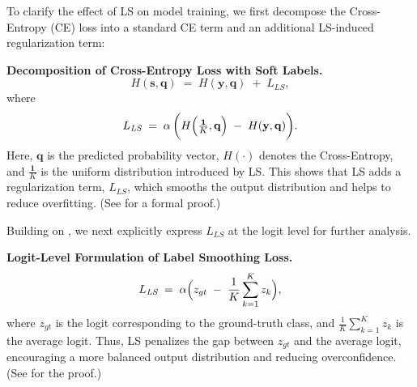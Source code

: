 To clarify the effect of LS on model training, we first decompose the Cross-Entropy (CE) loss into a standard CE term and an additional LS-induced regularization term:
\begin{lemma}
\label{lemma:ls-decomposition}
\textbf{Decomposition of Cross-Entropy Loss with Soft Labels.}
\begin{equation}
H(\mathbf{s}, \mathbf{q})
\;=\;
H(\mathbf{y}, \mathbf{q})
\;+\;
L_{\textit{LS}},
\end{equation}
where
\begin{equation}
L_{\textit{LS}}
\;=\;
\alpha\,\biggl(
    H\Bigl(\tfrac{\mathbf{1}}{K}, \mathbf{q}\Bigr)
    \;-\;
    H(\mathbf{y}, \mathbf{q})
\biggr).
\end{equation}
Here, \(\mathbf{q}\) is the predicted probability vector, \(H(\cdot)\) denotes the Cross-Entropy, and \(\frac{\mathbf{1}}{K}\) is the uniform distribution introduced by LS. This shows that LS adds a regularization term, \(L_{\textit{LS}}\), which smooths the output distribution and helps to reduce overfitting. (See  for a formal proof.)
\end{lemma}

\noindent
Building on , we next explicitly express \(L_{\textit{LS}}\) at the logit level for further analysis.

\begin{theorem}
\label{th:ce_ls}
\textbf{Logit-Level Formulation of Label Smoothing Loss.}
\begin{equation}
L_{\textit{LS}}
\;=\;
\alpha
\Bigl(
    z_{gt}
    \;-\;
    \frac{1}{K} \sum_{k=1}^K z_k
\Bigr),
\end{equation}
where \(z_{gt}\) is the logit corresponding to the ground-truth class, and \(\tfrac{1}{K} \sum_{k=1}^K z_k\) is the average logit. Thus, LS penalizes the gap between \(z_{gt}\) and the average logit, encouraging a more balanced output distribution and reducing overconfidence. (See  for the proof.)
\end{theorem}

